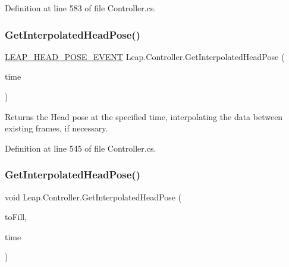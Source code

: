Definition at line 583 of file Controller.\+cs.

\mbox{\label{class_leap_1_1_controller_a569698b8f3bfbf04216145f4c39d317a}} 
\subsubsection{\texorpdfstring{GetInterpolatedHeadPose()}{GetInterpolatedHeadPose()}\hspace{0.1cm}{\footnotesize\ttfamily [1/2]}}
{\footnotesize\ttfamily \mbox{\hyperlink{struct_leap_internal_1_1_l_e_a_p___h_e_a_d___p_o_s_e___e_v_e_n_t}{L\+E\+A\+P\+\_\+\+H\+E\+A\+D\+\_\+\+P\+O\+S\+E\+\_\+\+E\+V\+E\+NT}} Leap.\+Controller.\+Get\+Interpolated\+Head\+Pose (\begin{DoxyParamCaption}\item[{Int64}]{time }\end{DoxyParamCaption})}



Returns the Head pose at the specified time, interpolating the data between existing frames, if necessary. 



Definition at line 545 of file Controller.\+cs.

\mbox{\label{class_leap_1_1_controller_a3a249a28db2fc7e0088440d55a290638}} 
\subsubsection{\texorpdfstring{GetInterpolatedHeadPose()}{GetInterpolatedHeadPose()}\hspace{0.1cm}{\footnotesize\ttfamily [2/2]}}
{\footnotesize\ttfamily void Leap.\+Controller.\+Get\+Interpolated\+Head\+Pose (\begin{DoxyParamCaption}\item[{ref \mbox{\hyperlink{struct_leap_internal_1_1_l_e_a_p___h_e_a_d___p_o_s_e___e_v_e_n_t}{L\+E\+A\+P\+\_\+\+H\+E\+A\+D\+\_\+\+P\+O\+S\+E\+\_\+\+E\+V\+E\+NT}}}]{to\+Fill,  }\item[{Int64}]{time }\end{DoxyParamCaption})}



